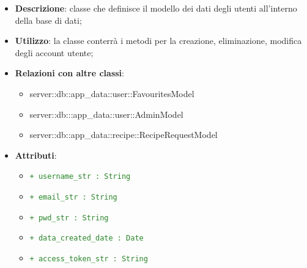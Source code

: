 			\begin{itemize}
				\item \textbf{Descrizione}: classe che definisce il modello dei dati degli utenti all'interno della base di dati;
				\item \textbf{Utilizzo}: la classe conterrà i metodi per la creazione, eliminazione, modifica degli account utente;
				\item \textbf{Relazioni con altre classi}:
					\begin{itemize}
						\item server::db::app\_data::user::FavouritesModel
						\item server::db:::app\_data::user::AdminModel
						\item server::db::app\_data::recipe::RecipeRequestModel
					\end{itemize}
				\item \textbf{Attributi}:
					\begin{itemize}
						\item \textcolor{forestgreen}{\texttt{+ username\_str : String}}
						\item \textcolor{forestgreen}{\texttt{+ email\_str : String}}
						\item \textcolor{forestgreen}{\texttt{+ pwd\_str : String}}
						\item \textcolor{forestgreen}{\texttt{+ data\_created\_date : Date}}
						\item \textcolor{forestgreen}{\texttt{+ access\_token\_str : String}}
\end{itemize}
\end{itemize}
